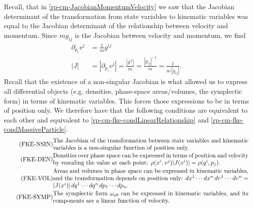 Recall, that in \ref{rp-cm-JacobianMomentumVelocity} we saw that the Jacobian determinant of the transformation from state variables to kinematic variables was equal to the Jacobian determinant of the relationship between velocity and momentum. Since $m g_{ij}$ is the Jacobian between velocity and momentum, we find
\begin{equation}\label{rp-cm-metricTensorDeterminantIsJacobianForDensities}
	\begin{aligned}
		\partial_{p_i} v^j &= \frac{1}{m}g^{ij} \\
		|J| &= |\partial_{p_i} v^j | = \frac{|g^{ij}|}{m} = \frac{|g_{ij}|^{-1}}{m} = \frac{1}{m \,|g_{ij}|}. 
	\end{aligned}
\end{equation}
Recall that the existence of a non-singular Jacobian is what allowed us to express all differential objects (e.g. densities, phase-space areas/volumes, the symplectic form) in terms of kinematic variables. This forces those expressions to be in terms of position only. We therefore have that the following conditions are equivalent to each other and equivalent to \ref{rp-cm-fke-condLinearRelationship} and \ref{rp-cm-fke-condMassiveParticle}.
\begin{align}
	\tag{FKE-NSIN}\label{rp-cm-fke-condJacobianOfPosition}
	&\eqtext{The Jacobian of the transformation between state variables and kinematic variables is a non-singular function of position only.} \\
	\tag{FKE-DEN}\label{rp-cm-fke-condDensitiesOfPosition}
	&\eqtext{Densities over phase space can be expressed in terms of position and velocity by rescaling the value at each point: $\rho(x^i, v^j) |J(x^i)| = \rho(q^i, p_j)$.} \\
	\tag{FKE-VOL}\label{rp-cm-fke-condAreasOfPosition}
	&\eqtext{Areas and volumes in phase space can be expressed in kinematic variables, and the transformation depends on position only: $dx^1 \cdots dx^n \, dv^1 \cdots dv^n = |J(x^i)| \, dq^1 \cdots dq^n \, dp_1 \cdots dp_n$.} \\
	\tag{FKE-SYMP}\label{rp-cm-fke-condSymplecticOfPosition}
	&\eqtext{The symplectic form $\omega_{ab}$ can be expressed in kinematic variables, and its components are a linear function of velocity.}
\end{align}

